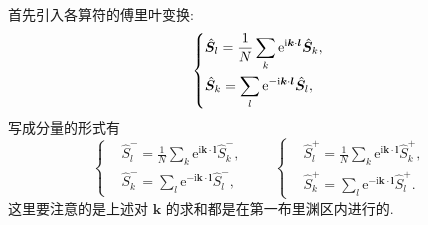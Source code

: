 首先引入各算符的傅里叶变换:
\begin{equation}
\left\{\begin{aligned}
&\hat{\boldsymbol S}_{l}=\frac{1}{N} \sum_{k} \mathrm{e}^{\mathrm{i} \boldsymbol{k} \cdot \boldsymbol{l}} \hat{\boldsymbol S}_{k} ,\\
&\hat{\boldsymbol S}_{k}=\sum_{l} \mathrm{e}^{-\mathrm{i}\boldsymbol{k} \cdot \boldsymbol{l}} \hat{\boldsymbol S}_{l},
\end{aligned}\right. \\
\end{equation}
写成分量的形式有
\begin{equation}
\left\{\begin{aligned} 
&{ \hat { S } _ { l } ^ { - } = \frac { 1 } { N } \sum _ { k } \mathrm{e} ^ {\mathrm{i} \boldsymbol { k } \cdot \boldsymbol { l } } \hat { S } _ { k } ^ { - } }, \\
&{ \hat { S } _ { k } ^ { - } = \sum _ { l } \mathrm{e} ^ { - \mathrm{i}\boldsymbol { k } \cdot \boldsymbol { l } } \hat { S } _ { l } ^ { - } },
\end{aligned} \right.
\qquad
\left\{\begin{aligned}
&\hat{S}_{l}^{+}=\frac{1}{N} \sum_{k} \mathrm{e}^{\mathrm{i} \boldsymbol{k} \cdot \boldsymbol{l}} \hat{S}_{k}^{+} ,\\
&\hat{S}_{k}^{+}=\sum_{l}\mathrm{e}^{-\mathrm{i} \boldsymbol{k} \cdot \boldsymbol{l}} \hat{S}_{l}^{+}.
\end{aligned}\right.
\end{equation}
这里要注意的是上述对 $\boldsymbol{k}$ 的求和都是在第一布里渊区内进行的. 

